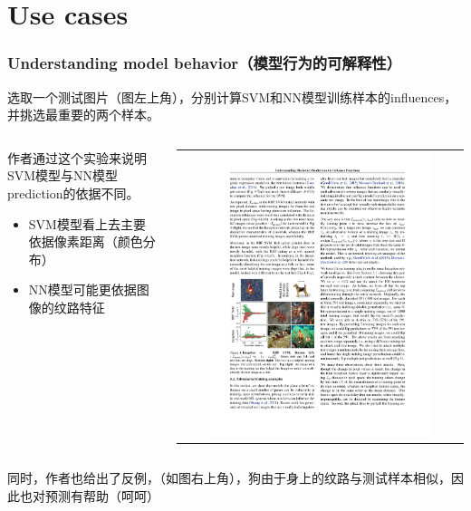 \documentclass[UTF8]{beamer}
\begin{document}
\section{Use cases}
\frame{\tableofcontents[currentsection, sectionstyle=show/shaded]}
\begin{frame}
\frametitle{Understanding model behavior（模型行为的可解释性）}
选取一个测试图片（图左上角），分别计算SVM和NN模型训练样本的influences，并挑选最重要的两个样本。
\begin{columns}[T]
\begin{column}{.48\textwidth}
作者通过这个实验来说明SVM模型与NN模型prediction的依据不同。
\begin{itemize}
\item SVM模型看上去主要依据像素距离（颜色分布）
\item NN模型可能更依据图像的纹路特征
\end{itemize}
\end{column}
\hfill%
\begin{column}{.48\textwidth}
\begin{tabular}{c}
\includegraphics[width=0.8\textwidth]{fish.pdf}
\end{tabular} 
\end{column}%
\end{columns}
同时，作者也给出了反例，（如图右上角），狗由于身上的纹路与测试样本相似，因此也对预测有帮助（呵呵）
\end{frame}
\end{document}
